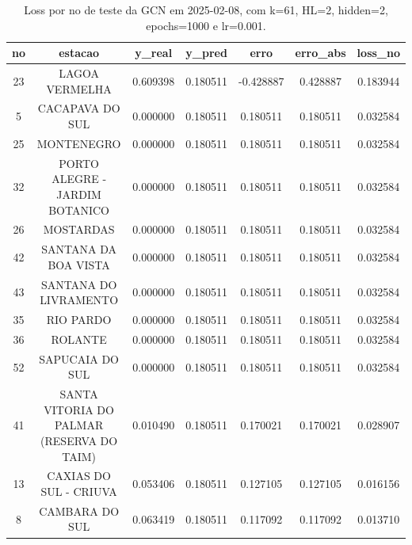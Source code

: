 \begin{table}[h]
\centering
\caption{Loss por no de teste da GCN em 2025-02-08, com k=61, HL=2, hidden=2, epochs=1000 e lr=0.001.}
\label{tab:gcn_loss_k61_hl2_h2_e1000_d20250208}
\begin{tabular}{ccccccc}
\toprule
no & estacao & y\_real & y\_pred & erro & erro\_abs & loss\_no \\
\midrule
23 & LAGOA VERMELHA & 0.609398 & 0.180511 & -0.428887 & 0.428887 & 0.183944 \\
5 & CACAPAVA DO SUL & 0.000000 & 0.180511 & 0.180511 & 0.180511 & 0.032584 \\
25 & MONTENEGRO & 0.000000 & 0.180511 & 0.180511 & 0.180511 & 0.032584 \\
32 & PORTO ALEGRE - JARDIM BOTANICO & 0.000000 & 0.180511 & 0.180511 & 0.180511 & 0.032584 \\
26 & MOSTARDAS & 0.000000 & 0.180511 & 0.180511 & 0.180511 & 0.032584 \\
42 & SANTANA DA BOA VISTA & 0.000000 & 0.180511 & 0.180511 & 0.180511 & 0.032584 \\
43 & SANTANA DO LIVRAMENTO & 0.000000 & 0.180511 & 0.180511 & 0.180511 & 0.032584 \\
35 & RIO PARDO & 0.000000 & 0.180511 & 0.180511 & 0.180511 & 0.032584 \\
36 & ROLANTE & 0.000000 & 0.180511 & 0.180511 & 0.180511 & 0.032584 \\
52 & SAPUCAIA DO SUL & 0.000000 & 0.180511 & 0.180511 & 0.180511 & 0.032584 \\
41 & SANTA VITORIA DO PALMAR (RESERVA DO TAIM) & 0.010490 & 0.180511 & 0.170021 & 0.170021 & 0.028907 \\
13 & CAXIAS DO SUL - CRIUVA & 0.053406 & 0.180511 & 0.127105 & 0.127105 & 0.016156 \\
8 & CAMBARA DO SUL & 0.063419 & 0.180511 & 0.117092 & 0.117092 & 0.013710 \\
\bottomrule
\end{tabular}
\end{table}
